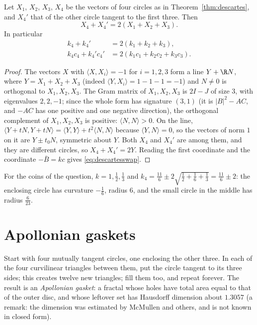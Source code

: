 \begin{proposition}\label{prop:swap}
Let $X_1$, $X_2$, $X_3$, $X_4$ be the vectors of four circles as in Theorem~\ref{thm:descartes}, and $X_4'$ that of the other circle tangent to the first
three. Then
\[
X_4+X_4'=2(X_1+X_2+X_3).
\]
In particular
\begin{equation}\label{eq:descartesswap}
\begin{aligned}
k_4+k_4'&=2(k_1+k_2+k_3),\\
k_4c_4+k_4'c_4'&=2(k_1c_1+k_2c_2+k_3c_3).
\end{aligned}
\end{equation}
\end{proposition}
\begin{proof}
The vectors $X$ with $\langle X,X_i\rangle=-1$ for $i=1,2,3$ form a line $Y+\R N$, where $Y=X_1+X_2+X_3$ (indeed $\langle Y,X_i\rangle=1-1-1=-1$) and $N\neq0$
is orthogonal to $X_1,X_2,X_3$. The Gram matrix of $X_1,X_2,X_3$ is $2I-J$ of size $3$, with eigenvalues $2,2,-1$; since the whole form has
signature $(3,1)$ (it is $|B|^2-AC$, and $-AC$ has one positive and one negative direction), the orthogonal complement of $X_1,X_2,X_3$ is
positive: $\langle N,N\rangle>0$. On the line, $\langle Y+tN,Y+tN\rangle=\langle Y,Y\rangle+t^2\langle N,N\rangle$ because $\langle Y,N\rangle=0$, so the
vectors of norm $1$ on it are $Y\pm t_0N$, symmetric about $Y$. Both $X_4$ and $X_4'$ are among them, and they are different circles, so
$X_4+X_4'=2Y$. Reading the first coordinate and the coordinate $-\bar B=kc$ gives \eqref{eq:descartesswap}.
\end{proof} For the coins of the question, $k=1,\frac12,\frac13$ and
$k_4=\frac{11}6\pm2\sqrt{\frac12+\frac16+\frac13}=\frac{11}6\pm2$: the enclosing circle has curvature $-\frac16$, radius $6$, and the small
circle in the middle has radius $\frac6{23}$.

\section{Apollonian gaskets}

Start with four mutually tangent circles, one enclosing the other three. In each of the four curvilinear triangles between them, put the
circle tangent to its three sides; this creates twelve new triangles; fill them too, and repeat forever. The result is an \emph{Apollonian
gasket}: a fractal whose holes have total area equal to that of the outer disc, and whose leftover set has Hausdorff dimension about
$1.3057$ (a remark: the dimension was estimated by McMullen and others, and is not known in closed form).

